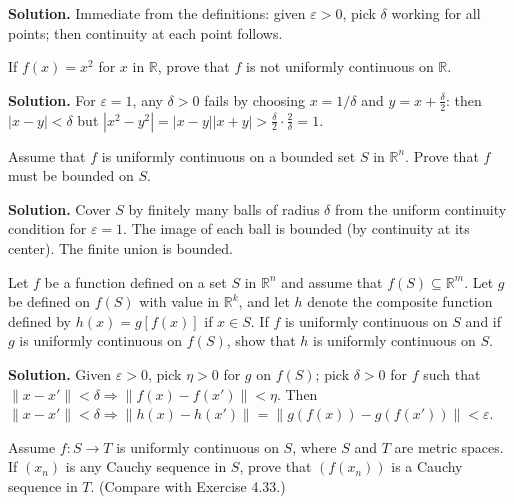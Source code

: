 \noindent\textbf{Solution.}
Immediate from the definitions: given $\varepsilon>0$, pick $\delta$ working for all points; then continuity at each point follows.
\medskip

\begin{problembox}
If $f(x) = x^2$ for $x$ in $\mathbb{R}$, prove that $f$ is not uniformly continuous on $\mathbb{R}$.
\end{problembox}

\noindent\textbf{Solution.}
For $\varepsilon=1$, any $\delta>0$ fails by choosing $x=1/\delta$ and $y=x+\tfrac{\delta}{2}$: then $|x-y|<\delta$ but $|x^2-y^2|=|x-y||x+y|>\tfrac{\delta}{2}\cdot\tfrac{2}{\delta}=1$.
\medskip

\begin{problembox}
Assume that $f$ is uniformly continuous on a bounded set $S$ in $\mathbb{R}^n$. Prove that $f$ must be bounded on $S$.
\end{problembox}

\noindent\textbf{Solution.}
Cover $S$ by finitely many balls of radius $\delta$ from the uniform continuity condition for $\varepsilon=1$. The image of each ball is bounded (by continuity at its center). The finite union is bounded.
\medskip

\begin{problembox}
Let $f$ be a function defined on a set $S$ in $\mathbb{R}^n$ and assume that $f(S) \subseteq \mathbb{R}^m$. Let $g$ be defined on $f(S)$ with value in $\mathbb{R}^k$, and let $h$ denote the composite function defined by $h(x) = g[f(x)]$ if $x \in S$. If $f$ is uniformly continuous on $S$ and if $g$ is uniformly continuous on $f(S)$, show that $h$ is uniformly continuous on $S$.
\end{problembox}

\noindent\textbf{Solution.}
Given $\varepsilon>0$, pick $\eta>0$ for $g$ on $f(S)$; pick $\delta>0$ for $f$ such that $\|x-x'\|<\delta\Rightarrow \|f(x)-f(x')\|<\eta$. Then $\|x-x'\|<\delta\Rightarrow \|h(x)-h(x')\|=\|g(f(x))-g(f(x'))\|<\varepsilon$.
\medskip

\begin{problembox}
Assume $f : S \to T$ is uniformly continuous on $S$, where $S$ and $T$ are metric spaces. If $(x_n)$ is any Cauchy sequence in $S$, prove that $(f(x_n))$ is a Cauchy sequence in $T$. (Compare with Exercise 4.33.)
\end{problembox}


